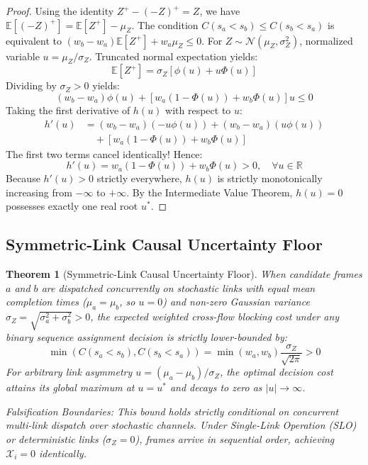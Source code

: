 \documentclass[10pt,journal,compsoc]{IEEEtran}
\newtheorem{theorem}{Theorem}
\begin{document}
\begin{proof}
Using the identity $Z^+ - (-Z)^+ = Z$, we have $\mathbb{E}[(-Z)^+] = \mathbb{E}[Z^+] - \mu_Z$. The condition $C(s_a < s_b) \le C(s_b < s_a)$ is equivalent to $(w_b - w_a) \mathbb{E}[Z^+] + w_a \mu_Z \le 0$. For $Z \sim \mathcal{N}(\mu_Z, \sigma_Z^2)$, normalized variable $u = \mu_Z / \sigma_Z$. Truncated normal expectation yields:
\begin{equation}
    \mathbb{E}[Z^+] = \sigma_Z \left[ \phi(u) + u \Phi(u) \right]
\end{equation}
Dividing by $\sigma_Z > 0$ yields:
\begin{equation}
    (w_b - w_a)\phi(u) + \left[w_a(1-\Phi(u)) + w_b\Phi(u)\right]u \le 0
\end{equation}
Taking the first derivative of $h(u)$ with respect to $u$:
\begin{align}
    h'(u) &= (w_b - w_a)(-u\phi(u)) + (w_b - w_a)(u\phi(u)) \nonumber \\
    &\quad + \left[ w_a(1-\Phi(u)) + w_b\Phi(u) \right]
\end{align}
The first two terms cancel identically! Hence:
\begin{equation}
    h'(u) = w_a (1 - \Phi(u)) + w_b \Phi(u) > 0, \quad \forall u \in \mathbb{R}
\end{equation}
Because $h'(u) > 0$ strictly everywhere, $h(u)$ is strictly monotonically increasing from $-\infty$ to $+\infty$. By the Intermediate Value Theorem, $h(u) = 0$ possesses exactly one real root $u^*$.
\end{proof}

\subsection{Symmetric-Link Causal Uncertainty Floor}

\begin{theorem}[Symmetric-Link Causal Uncertainty Floor]
\label{thm:lower_bound}
When candidate frames $a$ and $b$ are dispatched concurrently on stochastic links with equal mean completion times ($\mu_a = \mu_b$, so $u = 0$) and non-zero Gaussian variance $\sigma_Z = \sqrt{\sigma_a^2 + \sigma_b^2} > 0$, the expected weighted cross-flow blocking cost under any binary sequence assignment decision is strictly lower-bounded by:
\begin{equation}
    \min\left( C(s_a < s_b), C(s_b < s_a) \right) = \min(w_a, w_b) \frac{\sigma_Z}{\sqrt{2\pi}} > 0
\end{equation}
For arbitrary link asymmetry $u = (\mu_a - \mu_b) / \sigma_Z$, the optimal decision cost attains its global maximum at $u = u^*$ and decays to zero as $|u| \to \infty$.

\emph{Falsification Boundaries:} This bound holds strictly conditional on concurrent multi-link dispatch over stochastic channels. Under Single-Link Operation (SLO) or deterministic links ($\sigma_Z = 0$), frames arrive in sequential order, achieving $\mathcal{X}_i = 0$ identically.
\end{theorem}
\end{document}
